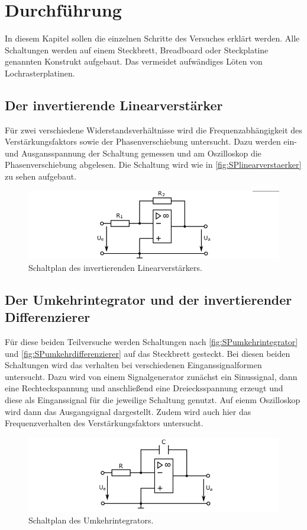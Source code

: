 \section{Durchführung}
\label{sec:Durchfuehrung}
In diesem Kapitel sollen die einzelnen Schritte des Versuches erklärt werden.
Alle Schaltungen werden auf einem Steckbrett, Breadboard oder Steckplatine genannten Konstrukt
aufgebaut. Das vermeidet aufwändiges Löten von Lochrasterplatinen.


\subsection{Der invertierende Linearverstärker}
Für zwei verschiedene Widerstandsverhältnisse wird die Frequenzabhängigkeit 
des Verstärkungsfaktors sowie der Phasenverschiebung untersucht. Dazu werden ein- 
und Ausgansspannung der Schaltung gemessen und am Oszilloskop die Phasenverschiebung abgelesen.
Die Schaltung wird wie in \autoref{fig:SPlinearverstaerker} zu sehen aufgebaut.
\begin{figure}
    \centering
    \includegraphics[width=1\textwidth]{content/grafiken/SPlinearverstaerker.PNG}
    \caption{Schaltplan des invertierenden Linearverstärkers. }
    \label{fig:SPlinearverstaerker}
  \end{figure}



\subsection{Der Umkehrintegrator und der invertierender Differenzierer}
Für diese beiden Teilversuche werden Schaltungen nach \autoref{fig:SPumkehrintegrator} und 
\autoref{fig:SPumkehrdifferenzierer} auf das Steckbrett gesteckt.
Bei diesen beiden Schaltungen wird das verhalten bei verschiedenen Einganssignalformen untersucht.
Dazu wird von einem Signalgenerator zunächst ein Sinussignal, dann eine Rechteckspannung und anschließend
eine Dreiecksspannung erzeugt und diese als Einganssignal für die jeweilige Schaltung genutzt.
Auf eienm Oszilloskop wird dann das Ausgangsignal dargestellt.
Zudem wird auch hier das Frequenzverhalten des Verstärkungsfaktors untersucht.
\begin{figure}
    \centering
    \includegraphics[width=1\textwidth]{content/grafiken/SPumkehrintegrator.PNG}
    \caption{Schaltplan des Umkehrintegrators.}
    \label{fig:SPumkehrintegrator}
  \end{figure}


